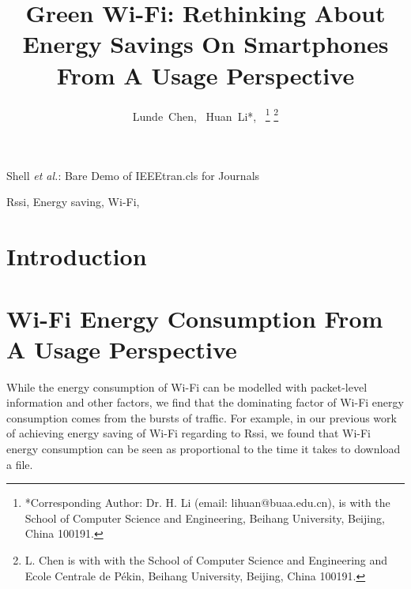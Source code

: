 \documentclass[journal]{IEEEtran}
\begin{document}
%
\title{Green Wi-Fi: Rethinking About Energy Savings On Smartphones From A Usage Perspective}
%
\author{Lunde~Chen,
        ~Huan~Li*,~%
\thanks{*Corresponding Author: Dr. H. Li (email: lihuan@buaa.edu.cn),  is with the School
of Computer Science and Engineering, Beihang University, Beijing,
China 100191.
}%
\thanks{L. Chen is with with the School of Computer Science and Engineering and Ecole Centrale de P\'{e}kin, Beihang University, Beijing, China 100191.}
}

{Shell \MakeLowercase{\textit{et al.}}: Bare Demo of IEEEtran.cls for Journals}
\maketitle

\begin{abstract}

\end{abstract}

\begin{IEEEkeywords}
Rssi, Energy saving, Wi-Fi, 
\end{IEEEkeywords}

\IEEEpeerreviewmaketitle

\section{Introduction}
\section{Wi-Fi Energy Consumption  From A Usage Perspective}
While the energy consumption of Wi-Fi can be modelled with packet-level information and other factors, 
we find that the dominating factor of Wi-Fi energy consumption comes from the bursts of traffic.
For example, in our previous work of achieving energy saving of Wi-Fi regarding to Rssi, we found that 
Wi-Fi energy consumption can be seen as proportional to the time it takes to download a file. 
\end{document}
